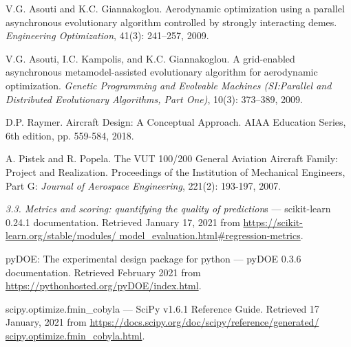 V.G. Asouti and K.C. Giannakoglou. Aerodynamic 
optimization using a parallel asynchronous evolutionary 
algorithm controlled by strongly interacting demes. 
\textit{Engineering Optimization}, 41(3): 241–257, 2009.

V.G. Asouti, I.C. Kampolis, and K.C. Giannakoglou. A 
grid-enabled asynchronous metamodel-assisted evolutionary 
algorithm for aerodynamic optimization. \textit{Genetic
Programming and Evolvable Machines (SI:Parallel and 
Distributed Evolutionary Algorithms, Part One)}, 
10(3): 373–389, 2009.

 
D.P. Raymer. Aircraft Design: A Conceptual Approach. AIAA 
Education Series, 6th edition, pp. 559-584, 2018. 

A. Pistek and R. Popela. The VUT 100/200 General 
Aviation Aircraft Family: Project and Realization. 
Proceedings of the Institution of Mechanical Engineers, 
Part G: \textit{Journal of Aerospace Engineering}, 221(2): 
193-197, 2007.

\textit{3.3. Metrics and scoring: quantifying the quality 
of prediction}s — scikit-learn 0.24.1 documentation. 
Retrieved January 17, 2021 from 
\url{https://scikit-learn.org/stable/modules/
model_evaluation.html#regression-metrics}.

pyDOE: The experimental design package for python — pyDOE 
0.3.6 documentation. Retrieved February 2021 from 
\url{https://pythonhosted.org/pyDOE/index.html}.

scipy.optimize.fmin\_cobyla — SciPy v1.6.1 Reference 
Guide. Retrieved 17 January, 2021 from 
\url{https://docs.scipy.org/doc/scipy/reference/generated/
scipy.optimize.fmin_cobyla.html}.
